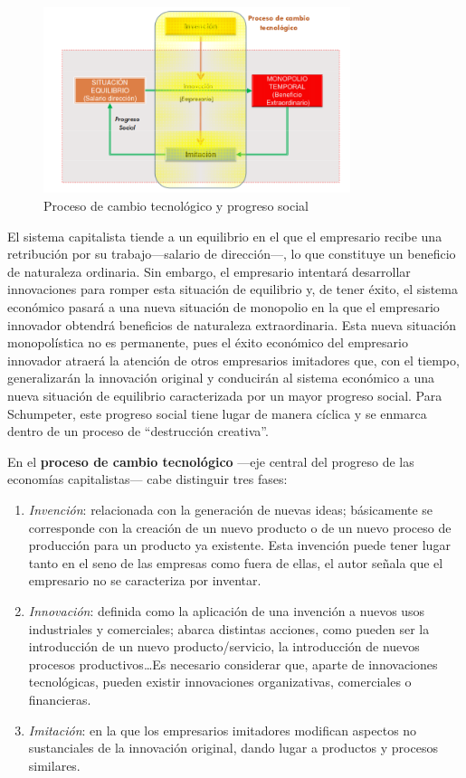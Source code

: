 \documentclass[12pt,a4paper,spanish]{report}
\begin{document}
			\begin{figure}
			 	\centering
			 		\includegraphics[width=0.8\textwidth]{3}
			 	\caption{Proceso de cambio tecnológico y progreso social}
			 	\label{empresario_innovador}
			 \end{figure}

			 El sistema capitalista tiende a un equilibrio en el que el empresario recibe una retribución por su trabajo---salario de dirección---, lo que constituye un beneficio de naturaleza ordinaria. Sin embargo, el empresario intentará desarrollar innovaciones para romper esta situación de equilibrio y, de tener éxito, el sistema económico pasará a una nueva situación de monopolio en la que el empresario innovador obtendrá beneficios de naturaleza extraordinaria. Esta nueva situación monopolística no es permanente, pues el éxito económico del empresario innovador atraerá la atención de otros empresarios imitadores que, con el tiempo, generalizarán la innovación original y conducirán al sistema económico a una nueva situación de equilibrio caracterizada por un mayor progreso social. Para Schumpeter, este progreso social tiene lugar de manera cíclica y se enmarca dentro de un proceso de ``destrucción creativa''.

			 En el \textbf{proceso de cambio tecnológico} ---eje central del progreso de las economías capitalistas--- cabe distinguir tres fases:
			 \begin{enumerate}[1.]
			 	\item \textcolor[rgb]{0.9,0.3,0.3}{\emph{Invención}}: relacionada con la generación de nuevas ideas; básicamente se corresponde con la creación de un nuevo producto o de un nuevo proceso de producción para un producto ya existente. Esta invención puede tener lugar tanto en el seno de las empresas como fuera de ellas, el autor señala que el empresario no se caracteriza por inventar.
			 	\item \textcolor[rgb]{0.9,0.3,0.3}{\emph{Innovación}}: definida como la aplicación de una invención a nuevos usos industriales y comerciales; abarca distintas acciones, como pueden ser la introducción de un nuevo producto/servicio, la introducción de nuevos procesos productivos\ldots Es necesario considerar que, aparte de innovaciones tecnológicas, pueden existir innovaciones organizativas, comerciales o financieras.
			 	\item \textcolor[rgb]{0.9,0.3,0.3}{\emph{Imitación}}: en la que los empresarios imitadores modifican aspectos no sustanciales de la innovación original, dando lugar a productos y procesos similares.
			 \end{enumerate}
\end{document}
